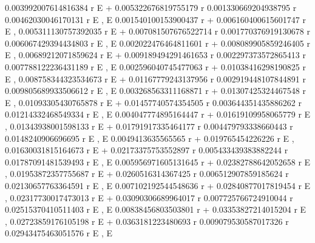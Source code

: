 \documentclass{article}
\begin{document}
     0.003992007614816384 r
    E                       + 0.005322676819755179 r
      0.001330669204938795 r   0.00462030046170131 r
     E                      , E
                               0.001540100153900437 r
     + 0.006160400615601747 r E                      , 
     0.005311130757392035 r
    E                       + 0.007081507676522714 r
      0.001770376919130678 r   0.006067429394434803 r
     E                      , E
                               0.002022476464811601 r
     + 0.008089905859246405 r E                      , 
     0.00689212071859624 r
    E                      + 0.009189494291461653 r
      0.002297373572865413 r   0.007788122236431189 r
     E                      , E
                              0.002596040745477063 r
     + 0.01038416298190825 r E                      , 
     0.008758344323534673 r
    E                       + 0.01167779243137956 r
      0.002919448107844891 r   0.009805689933506612 r
     E                      , E
                              0.003268563311168871 r
     + 0.01307425324467548 r E                      , 
     0.01093305430765878 r
    E                      + 0.01457740574354505 r
      0.003644351435886262 r   0.01214332468549334 r
     E                      , E
                              0.004047774895164447 r
     + 0.01619109958065779 r E                      , 
     0.01343938001598133 r
    E                      + 0.01791917335464177 r
      0.004479793338660443 r   0.0148240906696695 r
     E                      , E
                            0.0049413635565565 r
     + 0.019765454226226 r E                    , 
     0.01630031815164673 r
    E                      + 0.02173375753552897 r
      0.005433439383882244 r   0.01787091481539493 r
     E                      , E
                              0.005956971605131645 r
     + 0.02382788642052658 r E                      , 
     0.01953872357755687 r
    E                      + 0.0260516314367425 r
      0.006512907859185624 r   0.02130657763364591 r
     E                      , E
                              0.007102192544548636 r
     + 0.02840877017819454 r E                      , 
     0.02317730017473013 r
    E                      + 0.03090306689964017 r
      0.007725766724910044 r   0.02515370410511403 r
     E                      , E
                              0.00838456803503801 r
     + 0.03353827214015204 r E                     , 
     0.02723859176105198 r
    E                      + 0.0363181223480693 r
      0.009079530587017326 r   0.02943475463051576 r
     E                      , E
\end{document}
